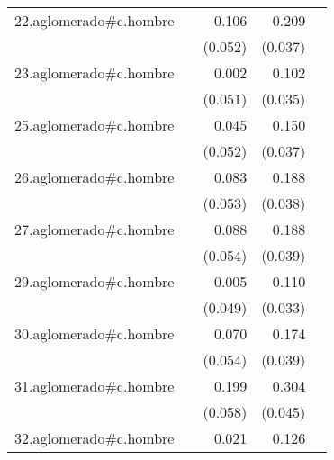 {\begin{longtable}{l*{4}{D{.}{.}{-1}}}
\addlinespace
22.aglomerado#c.hombre&                     &       0.106\sym{*}  &       0.209\sym{***}&                     \\
            &                     &     (0.052)         &     (0.037)         &                     \\
\addlinespace
23.aglomerado#c.hombre&                     &       0.002         &       0.102\sym{**} &                     \\
            &                     &     (0.051)         &     (0.035)         &                     \\
\addlinespace
25.aglomerado#c.hombre&                     &       0.045         &       0.150\sym{***}&                     \\
            &                     &     (0.052)         &     (0.037)         &                     \\
\addlinespace
26.aglomerado#c.hombre&                     &       0.083         &       0.188\sym{***}&                     \\
            &                     &     (0.053)         &     (0.038)         &                     \\
\addlinespace
27.aglomerado#c.hombre&                     &       0.088         &       0.188\sym{***}&                     \\
            &                     &     (0.054)         &     (0.039)         &                     \\
\addlinespace
29.aglomerado#c.hombre&                     &       0.005         &       0.110\sym{***}&                     \\
            &                     &     (0.049)         &     (0.033)         &                     \\
\addlinespace
30.aglomerado#c.hombre&                     &       0.070         &       0.174\sym{***}&                     \\
            &                     &     (0.054)         &     (0.039)         &                     \\
\addlinespace
31.aglomerado#c.hombre&                     &       0.199\sym{***}&       0.304\sym{***}&                     \\
            &                     &     (0.058)         &     (0.045)         &                     \\
\addlinespace
32.aglomerado#c.hombre&                     &       0.021         &       0.126\sym{***}&                     \\

\end{longtable}}

